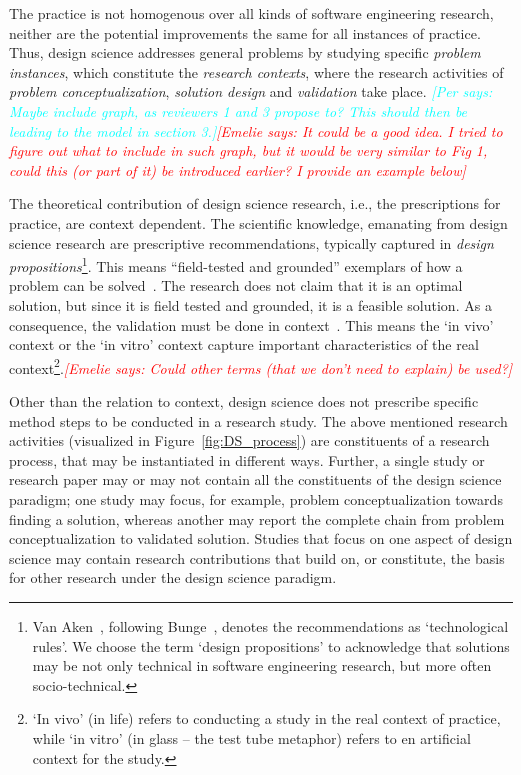 \documentclass[graybox]{svmult}
\newcommand{\emelie}[1]{\textcolor{red}{{\it [Emelie says: #1]}}}
\newcommand{\per}[1]{\textcolor{cyan}{{\it [Per says: #1]}}}
\newcommand{\emelie}[1]{}
\newcommand{\per}[1]{}
\begin{document}
The practice is not homogenous over all kinds of software engineering research, neither are the potential improvements the same for all instances of practice. Thus, design science addresses general problems by studying  specific \emph{problem instances}, which constitute the \emph{research contexts}, where the research activities of \emph{problem conceptualization}, \emph{solution design} and \emph{validation} take place. \per{Maybe include graph, as reviewers 1 and 3 propose to? This should then be leading to the model in section 3.}\emelie{It could be a good idea. I tried to figure out what to include in such graph, but it would be very similar to Fig 1, could this (or part of it) be introduced earlier? I provide an example below}



The theoretical contribution of design science research, i.e., the prescriptions for practice, are context dependent. The scientific knowledge, emanating from design science research are prescriptive recommendations, typically captured in \emph{design propositions}\footnote{Van Aken~\cite{van_aken_management_2004}, following Bunge~\cite{bunge_philosophy_1998}, denotes the recommendations as `technological rules'. We choose the term `design propositions' to acknowledge that solutions may be not only technical in software engineering research, but more often socio-technical.}. This means ``field-tested and grounded'' exemplars of how a problem can be solved~\cite{van_aken_management_2004}. The research does not claim that it is an optimal solution, but since it is field tested and grounded, it is a feasible solution.
As a consequence, the validation must be done in context~\cite{wieringa_what_2014}.  This means the  `in vivo' context or the `in vitro' context capture important characteristics of the real context\footnote{`In vivo' (in life) refers to conducting a study in the real context of practice, while `in vitro' (in glass -- the test tube metaphor) refers to en artificial context for the study.}.\emelie{Could other terms (that we don't need to explain) be used?}   





Other than the relation to context, design science does not prescribe specific method steps to be conducted in a research study. The above mentioned research activities (visualized in Figure~\ref{fig:DS_process}) are constituents of  a research process, that may be instantiated in different ways. 
Further, a single study or research paper may or may not contain all the constituents of the design science paradigm; one study may focus, for example,  problem conceptualization towards finding a solution, whereas another may report the complete chain from problem conceptualization to validated solution. Studies that focus on one aspect of design science may contain research contributions that build on, or constitute, the basis for other research under the design science paradigm.
\end{document}
